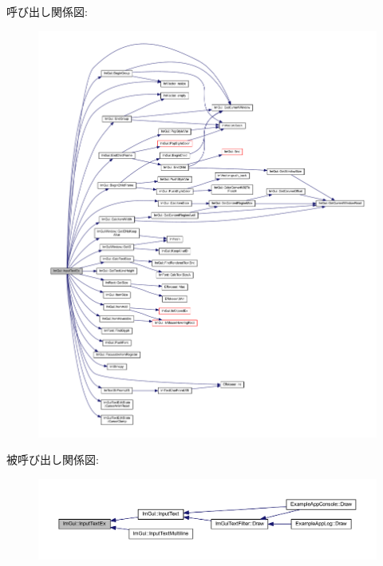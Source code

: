 呼び出し関係図\+:\nopagebreak
\begin{figure}[H]
\begin{center}
\leavevmode
\includegraphics[width=350pt]{namespace_im_gui_a4a62260abe773d4e193db94cdfdc41bf_cgraph}
\end{center}
\end{figure}
被呼び出し関係図\+:\nopagebreak
\begin{figure}[H]
\begin{center}
\leavevmode
\includegraphics[width=350pt]{namespace_im_gui_a4a62260abe773d4e193db94cdfdc41bf_icgraph}
\end{center}
\end{figure}
\mbox{\label{namespace_im_gui_a94b4d241eafa1a4a077f98f5aee00dda}} 

